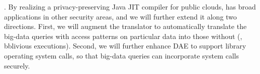 
. By realizing a privacy-preserving Java JIT compiler for 
public clouds, \maat has broad applications in other security areas, and we 
will further extend it along two directions. First, we will augment the 
translator to automatically translate the big-data queries with access 
patterns on particular data into those without (\eg, bblivious executions). 
Second, we will further enhance DAE to support library operating system calls, 
so that big-data queries can incorporate system calls securely.



% 


